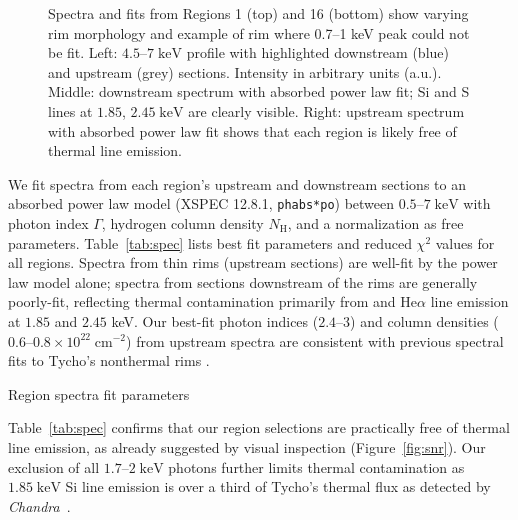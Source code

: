 \documentclass[iop, apj, numberedappendix, twocolappendix]{emulateapj}
\newcommand*{\mt}{\mathrm}
\newcommand*{\unit}[1]{\;\mt{#1}}  %
\newcommand*{\Chandra}{\textit{Chandra}\ }
\begin{document}
\begin{figure*}
    \caption{Spectra and fits from Regions 1 (top) and 16 (bottom) show varying
    rim morphology and example of rim where 0.7--1 keV peak could not be fit.
    Left: $4.5$--$7 \unit{keV}$ profile with highlighted downstream (blue) and
    upstream (grey) sections.  Intensity in arbitrary units (a.u.).  Middle:
    downstream spectrum with absorbed power law fit; Si and S lines at $1.85$,
    $2.45 \unit{keV}$ are clearly visible.  Right: upstream spectrum with
    absorbed power law fit shows that each region is likely free of thermal
    line
emission.}
    \label{fig:spec}
\end{figure*}

We fit spectra from each region's upstream and downstream sections to an
absorbed power law model (XSPEC 12.8.1, \texttt{phabs*po}) between $0.5$--$7
\unit{keV}$ with photon index $\Gamma$, hydrogen column density $N_{\mt{H}}$,
and a normalization as free parameters.  Table~\ref{tab:spec} lists best fit
parameters and reduced $\chi^2$ values for all regions.  Spectra from thin rims
(upstream sections) are well-fit by the power law model alone; spectra from
sections downstream of the rims are generally poorly-fit, reflecting thermal
contamination primarily from  and  He$\alpha$ line
emission at $1.85$ and $2.45$ keV.  Our best-fit photon indices ($2.4$--$3$)
and column densities ($0.6$--$0.8 \times 10^{22} \unit{cm^{-2}}$) from upstream
spectra are consistent with previous spectral fits to Tycho's nonthermal rims
\citep{hwang2002, cassam-chenai2007}.

\begin{table}
    \scriptsize
    \centering
    \caption{Region spectra fit parameters\label{tab:spec}}
    
\end{table}

Table~\ref{tab:spec} confirms that our region selections are practically free
of thermal line emission, as already suggested by visual inspection
(Figure~\ref{fig:snr}).  Our exclusion of all $1.7$--$2 \unit{keV}$ photons
further limits thermal contamination as $1.85 \unit{keV}$ Si line emission is
over a third of Tycho's thermal flux as detected by \Chandra \citep{hwang2002}.
\end{document}
